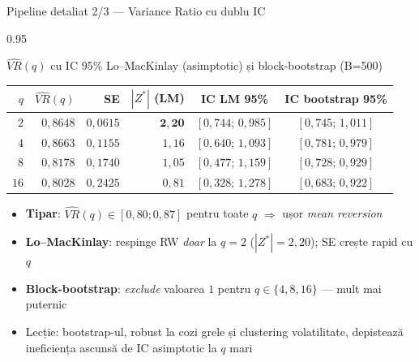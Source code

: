 \documentclass[9pt, aspectratio=169, t]{beamer}
\begin{document}
\begin{frame}[shrink=12]{Pipeline detaliat 2/3 --- Variance Ratio cu dublu IC}
\begin{cminipage}{0.95\textwidth}
\begin{block}{$\widehat{VR}(q)$ cu IC 95\% Lo--MacKinlay (asimptotic) și block-bootstrap (B=500)}
\renewcommand{\arraystretch}{1.05}
\footnotesize
\begin{tabular}{rrrrcc}
\toprule
$q$ & $\widehat{VR}(q)$ & SE & $|Z^*|$ (LM) & IC LM 95\% & IC bootstrap 95\% \\
\midrule
$2$  & $0{,}8648$ & $0{,}0615$ & $\mathbf{2{,}20}$ & $[0{,}744;\, 0{,}985]$ & $[0{,}745;\, 1{,}011]$ \\
$4$  & $0{,}8663$ & $0{,}1155$ & $1{,}16$           & $[0{,}640;\, 1{,}093]$ & $[0{,}781;\, 0{,}979]$ \\
$8$  & $0{,}8178$ & $0{,}1740$ & $1{,}05$           & $[0{,}477;\, 1{,}159]$ & $[0{,}728;\, 0{,}929]$ \\
$16$ & $0{,}8028$ & $0{,}2425$ & $0{,}81$           & $[0{,}328;\, 1{,}278]$ & $[0{,}683;\, 0{,}922]$ \\
\bottomrule
\end{tabular}
\end{block}
\begin{itemize}\setlength{\itemsep}{0pt}
    \item \textbf{Tipar}: $\widehat{VR}(q) \in [0{,}80; 0{,}87]$ pentru toate $q$ $\Rightarrow$ ușor \emph{mean reversion}
    \item \textbf{Lo--MacKinlay}: respinge RW \emph{doar} la $q=2$ ($|Z^*|=2{,}20$); SE crește rapid cu $q$
    \item \textbf{Block-bootstrap}: \emph{exclude} valoarea $1$ pentru $q \in \{4, 8, 16\}$ --- mult mai puternic
    \item \alert{Lecție}: bootstrap-ul, robust la cozi grele și clustering volatilitate, depistează ineficiența ascunsă de IC asimptotic la $q$ mari
\end{itemize}
\end{cminipage}
\end{frame}
\end{document}
